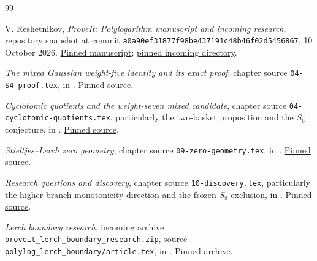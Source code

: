 \begin{thebibliography}{99}
\raggedright
{}

V. Reshetnikov, \emph{ProveIt: Polylogarithm manuscript and incoming research},
repository snapshot at commit
\texttt{a0a90ef31877f98be437191c48b46f02d5456867},
10 October 2026.
\href{https://github.com/VladimirReshetnikov/ProveIt/tree/a0a90ef31877f98be437191c48b46f02d5456867/Analysis/Polylogarithms/docs/manuscript}{Pinned manuscript};
\href{https://github.com/VladimirReshetnikov/ProveIt/tree/a0a90ef31877f98be437191c48b46f02d5456867/docs/incoming}{pinned incoming directory}.

\emph{The mixed Gaussian weight-five identity and its exact proof},
chapter source \nolinkurl{04-S4-proof.tex}, in \cite{Project}.
\href{https://github.com/VladimirReshetnikov/ProveIt/blob/a0a90ef31877f98be437191c48b46f02d5456867/Analysis/Polylogarithms/docs/manuscript/chapters/04-S4-proof.tex}{Pinned source}.

\emph{Cyclotomic quotients and the weight-seven mixed candidate},
chapter source \nolinkurl{04-cyclotomic-quotients.tex}, particularly
the two-basket proposition and the $S_6$ conjecture, in \cite{Project}.
\href{https://github.com/VladimirReshetnikov/ProveIt/blob/a0a90ef31877f98be437191c48b46f02d5456867/Analysis/Polylogarithms/docs/manuscript/chapters/04-cyclotomic-quotients.tex}{Pinned source}.

\emph{Stieltjes--Lerch zero geometry},
chapter source \nolinkurl{09-zero-geometry.tex}, in \cite{Project}.
\href{https://github.com/VladimirReshetnikov/ProveIt/blob/a0a90ef31877f98be437191c48b46f02d5456867/Analysis/Polylogarithms/docs/manuscript/chapters/09-zero-geometry.tex}{Pinned source}.

\emph{Research questions and discovery},
chapter source \nolinkurl{10-discovery.tex}, particularly the
higher-branch monotonicity direction and the frozen $S_8$ exclusion,
in \cite{Project}.
\href{https://github.com/VladimirReshetnikov/ProveIt/blob/a0a90ef31877f98be437191c48b46f02d5456867/Analysis/Polylogarithms/docs/manuscript/chapters/10-discovery.tex}{Pinned source}.

\emph{Lerch boundary research},
incoming archive \nolinkurl{proveit_lerch_boundary_research.zip},
source \nolinkurl{polylog_lerch_boundary/article.tex}, in \cite{Project}.
\href{https://github.com/VladimirReshetnikov/ProveIt/blob/a0a90ef31877f98be437191c48b46f02d5456867/docs/incoming/proveit_lerch_boundary_research.zip}{Pinned archive}.


\end{thebibliography}
